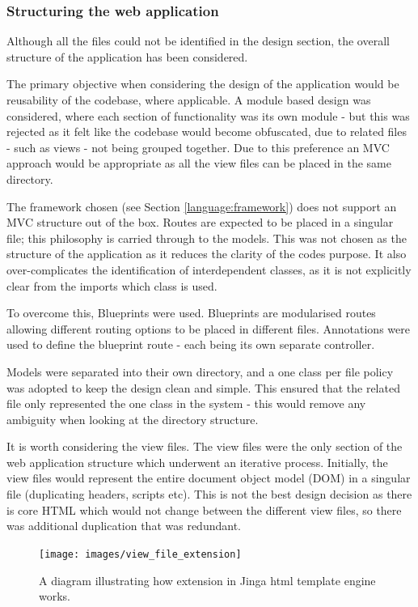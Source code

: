 \subsubsection{Structuring the web application}
Although all the files could not be identified in the design section, the overall structure of the application has been considered.

The primary objective when considering the design of the application would be reusability of the codebase, where applicable. A module based design was considered, where each section of functionality was its own module - but this was rejected as it felt like the codebase would become obfuscated, due to related files - such as views - not being grouped together. Due to this preference an MVC approach would be appropriate as all the view files can be placed in the same directory.

The framework chosen (see Section \ref{language:framework}) does not support an MVC structure out of the box. Routes are expected to be placed in a singular file; this philosophy is carried through to the models. This was not chosen as the structure of the application as it reduces the clarity of the codes purpose. It also over-complicates the identification of interdependent classes, as it is not explicitly clear from the imports which class is used.

To overcome this, Blueprints \cite{citeulike:13983911} were used. Blueprints are modularised routes allowing different routing options to be placed in different files. Annotations were used to define the blueprint route - each being its own separate controller.

Models were separated into their own directory, and a one class per file policy was adopted to keep the design clean and simple. This ensured that the related file only represented the one class in the system - this would remove any ambiguity when looking at the directory structure.

It is worth considering the view files. The view files were the only section of the web application structure which underwent an iterative process. Initially, the view files would represent the entire document object model (DOM) in a singular file (duplicating headers, scripts etc). This is not the best design decision as there is core HTML which would not change between the different view files, so there was additional duplication that was redundant.

\begin{figure}[H]
  \centering
  \texttt{[image: images/view\_file\_extension]}
  \caption{A diagram illustrating how extension in Jinga html template engine works.}
  \label{fig:extension}
\end{figure}

